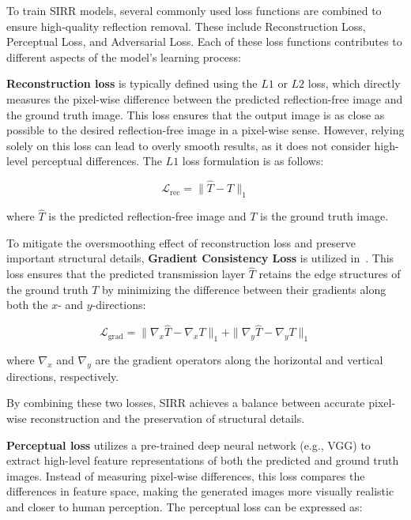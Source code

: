 To train SIRR models, several commonly used loss functions are combined to ensure high-quality reflection removal. These include Reconstruction Loss, Perceptual Loss\cite{johnson2016perceptual}, and Adversarial Loss\cite{goodfellow2014generative}. Each of these loss functions contributes to different aspects of the model’s learning process:

\textbf{Reconstruction loss} is typically defined using the $L1$ or $L2$ loss, which directly measures the pixel-wise difference between the predicted reflection-free image and the ground truth image. This loss ensures that the output image is as close as possible to the desired reflection-free image in a pixel-wise sense. However, relying solely on this loss can lead to overly smooth results, as it does not consider high-level perceptual differences. The $L1$ loss formulation is as follows:

\begin{equation}
    \mathcal{L}_{\text{rec}} = \| \hat{T} - T \|_1
\end{equation}

where \( \hat{T} \) is the predicted reflection-free image and \( T \) is the ground truth image.

To mitigate the oversmoothing effect of reconstruction loss and preserve important structural details, \textbf{Gradient Consistency Loss} is utilized in~\cite{wei2019single}. This loss ensures that the predicted transmission layer \( \hat{T} \) retains the edge structures of the ground truth \( T \) by minimizing the difference between their gradients along both the \( x \)- and \( y \)-directions:

\begin{equation}
    \mathcal{L}_{\text{grad}} = \|\nabla_x \hat{T} - \nabla_x T\|_1 + \|\nabla_y \hat{T} - \nabla_y T\|_1
\end{equation}

where \( \nabla_x \) and \( \nabla_y \) are the gradient operators along the horizontal and vertical directions, respectively.

By combining these two losses, SIRR achieves a balance between accurate pixel-wise reconstruction and the preservation of structural details.



\textbf{Perceptual loss} utilizes a pre-trained deep neural network (e.g., VGG) to extract high-level feature representations of both the predicted and ground truth images. Instead of measuring pixel-wise differences, this loss compares the differences in feature space, making the generated images more visually realistic and closer to human perception. The perceptual loss can be expressed as:

